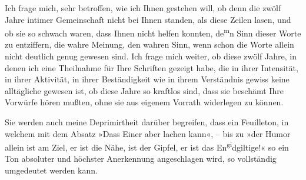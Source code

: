 \pstart
           Ich frage mich, sehr betroffen, wie ich Ihnen gestehen will, ob denn die zwölf Jahre
               intimer Gemeinschaft nicht bei Ihnen standen, als \label{K_L03353-8v}\label{K_L03353-8} diese Zeilen lasen, und ob sie so
               schwach waren,  dass \label{K_L03353-9v}\label{K_L03353-9} Ihnen nicht helfen konnten, de\substVorne{}\textsuperscript{m}\substDazwischen{}n\substHinten{} Sinn dieser Worte zu entziffern, die wahre Meinung, den wahren Sinn, wenn
               schon die Worte allein nicht deutlich genug gewesen sind. Ich frage mich weiter, ob
               diese zwölf Jahre, in denen ich eine Theilnahme für Ihre Schriften gezeigt habe, die
               in ihrer Intensität, in ihrer Aktivität, in ihrer Beständigkeit wie in ihrem
               Verständnis gewiss keine alltägliche gewesen ist, ob diese Jahre so kraftlos sind,
               dass sie beschämt Ihre Vorwürfe hören mußten, ohne sie aus eigenem Vorrath widerlegen
               zu können.\pend
           
\pstart
           Sie werden auch meine Deprimirtheit darüber begreifen, dass ein Feuilleton, in welchem mit dem Absatz »Dass Einer aber lachen kann«, –
               bis zu »der Humor allein ist am
                  Ziel, er ist die Nähe, ist der Gipfel, er ist das En\substVorne{}\textsuperscript{gi}\substDazwischen{}dg\substHinten{}iltige!« so ein Ton absoluter und höchster Anerkennung angeschlagen
               wird, so vollständig umgedeutet werden kann.\pend
           
